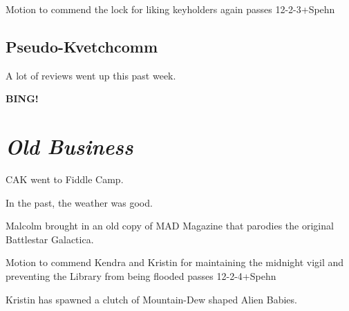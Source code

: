 \documentclass[10pt]{article}
\newcommand{\bing}{{\bf BING!} }
\newcommand{\goto}[1]{\bing \vskip 12pt \section*{{\em{#1}}}}
\begin{document}
Motion to commend the lock for liking keyholders again passes 12-2-3+Spehn

\subsection*{Pseudo-Kvetchcomm}

A lot of reviews went up this past week.








\goto{Old Business}

CAK went to Fiddle Camp.

In the past, the weather was good.

Malcolm brought in an old copy of MAD Magazine that parodies the original Battlestar Galactica.

Motion to commend Kendra and Kristin for maintaining the midnight vigil and preventing the Library from being flooded passes 12-2-4+Spehn

Kristin has spawned a clutch of Mountain-Dew shaped Alien Babies.
\end{document}
